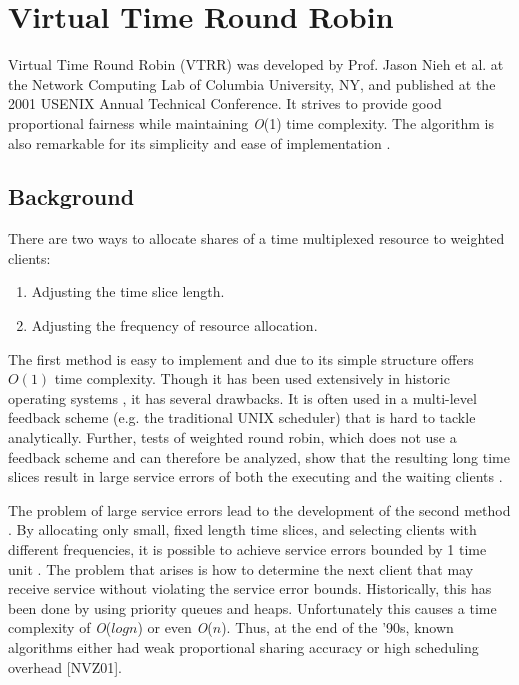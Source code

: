 \chapter{Virtual Time Round Robin}

Virtual Time Round Robin (VTRR) was developed by Prof. Jason Nieh et al. at the 
Network Computing Lab of Columbia University, NY, and published at the 2001 USENIX
Annual Technical Conference. It strives to provide good proportional fairness while 
maintaining \emph{O}(1) time complexity. The algorithm is also remarkable for its simplicity and ease
of implementation \cite{nvz01}.

\section{Background}

There are two ways to allocate shares of a time multiplexed resource to weighted clients:

\begin{enumerate}
  \item Adjusting the time slice length.
  \item Adjusting the frequency of resource allocation.
\end{enumerate}

The first method is easy to implement and due to its simple structure offers $O(1)$ time 
complexity. Though it has been used extensively in historic operating systems , it has
several drawbacks. It is often used in a multi-level feedback scheme (e.g. the traditional
UNIX scheduler) that is hard to tackle analytically. Further, tests of weighted
round robin, which does not use a feedback scheme and can therefore be analyzed, show
that the resulting long time slices result in large service errors of both the executing and
the waiting clients \cite{nvz01}.

The problem of large service errors lead to the development of the second method \cite{dks89}.
By allocating only small, fixed length time slices, and selecting clients with different 
frequencies, it is possible to achieve service errors bounded by 1 time unit \cite{bz96}. The
problem that arises is how to determine the next client that may receive service without
violating the service error bounds. Historically, this has been done by using priority queues
and heaps. Unfortunately this causes a time complexity of \emph{O}($log n$) or even \emph{O}($n$).
Thus, at the end of the '90s, known algorithms either had weak proportional sharing accuracy or high scheduling overhead [NVZ01].


